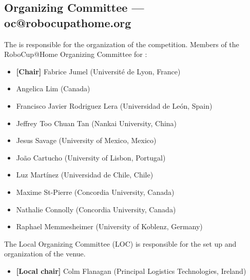 \subsection{Organizing Committee --- oc@robocupathome.org}
\label{sec:oc}
The  is responsible for the organization of the competition. Members of the RoboCup@Home Organizing Committee for \YEAR:

\begin{itemize}
	\item \textbf{[Chair]} Fabrice Jumel (Université de Lyon, France)
	\item Angelica Lim (Canada) %
	\item Francisco Javier Rodriguez Lera (Universidad de León, Spain)
	\item Jeffrey Too Chuan Tan (Nankai University, China)
	\item Jesus Savage (University of Mexico, Mexico)
	\item João Cartucho (University of Lisbon, Portugal)
	\item Luz Martínez (Universidad de Chile, Chile)
	\item Maxime St-Pierre (Concordia University, Canada)
	\item Nathalie Connolly (Concordia University, Canada)
	\item Raphael Memmesheimer (University of Koblenz, Germany)
\end{itemize}

The Local Organizing Committee (LOC) is responsible for the set up and organization of the venue.
\begin{itemize}
	\item \textbf{[Local chair]} Colm Flanagan (Principal Logistics Technologies, Ireland)
\end{itemize}
